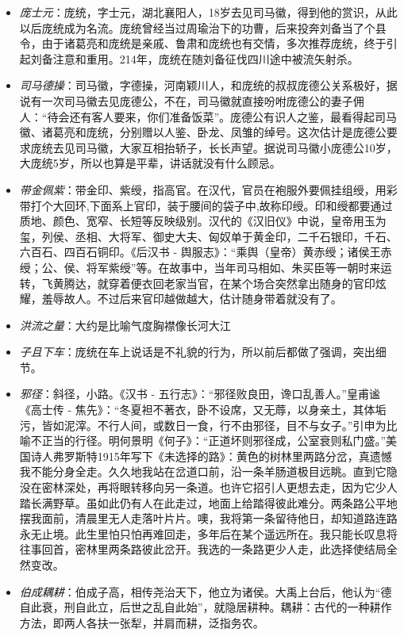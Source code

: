 \documentclass[]{book}
\providecommand{\tightlist}{%
  \setlength{\itemsep}{0pt}\setlength{\parskip}{0pt}}
\begin{document}
\begin{itemize}
\tightlist
\item
  \emph{庞士元}：庞统，字士元，湖北襄阳人，18岁去见司马徽，得到他的赏识，从此以后庞统成为名流。庞统曾经当过周瑜治下的功曹，后来投奔刘备当了个县令，由于诸葛亮和庞统是亲戚、鲁肃和庞统也有交情，多次推荐庞统，终于引起刘备注意和重用。214年，庞统在随刘备征伐四川途中被流矢射杀。
\item
  \emph{司马德操}：司马徽，字德操，河南颖川人，和庞统的叔叔庞德公关系极好，据说有一次司马徽去见庞德公，不在，司马徽就直接吩咐庞德公的妻子佣人：``待会还有客人要来，你们准备饭菜''。庞德公有识人之鉴，最看得起司马徽、诸葛亮和庞统，分别赠以人鉴、卧龙、凤雏的绰号。这次估计是庞德公要求庞统去见司马徽，大家互相抬轿子，长长声望。据说司马徽小庞德公10岁，大庞统5岁，所以也算是平辈，讲话就没有什么顾忌。
\item
  \emph{带金佩紫}：带金印、紫绶，指高官。在汉代，官员在袍服外要佩挂组绶，用彩带打个大回环,下面系上官印，装于腰间的袋子中,故称印绶。印和绶都要通过质地、颜色、宽窄、长短等反映级别。汉代的《汉旧仪》中说，皇帝用玉为玺，列侯、丞相、大将军、御史大夫、匈奴单于黄金印，二千石银印，千石、六百石、四百石铜印。《后汉书
  -
  舆服志》：``乘舆（皇帝）黄赤绶；诸侯王赤绶；公、侯、将军紫绶''等。在故事中，当年司马相如、朱买臣等一朝时来运转，飞黄腾达，就穿着便衣回老家当官，在某个场合突然拿出随身的官印炫耀，羞辱故人。不过后来官印越做越大，估计随身带着就没有了。
\item
  \emph{洪流之量}：大约是比喻气度胸襟像长河大江
\item
  \emph{子且下车}：庞统在车上说话是不礼貌的行为，所以前后都做了强调，突出细节。
\item
  \emph{邪径}：斜径，小路。《汉书 -
  五行志》：``邪径败良田，谗口乱善人。''皇甫谧《高士传 -
  焦先》：``冬夏袒不著衣，卧不设席，又无蓐，以身亲土，其体垢污，皆如泥滓。不行人间，或数日一食，行不由邪径，目不与女子。''引申为比喻不正当的行径。明何景明《何子》：``正道坏则邪径成，公室衰则私门盛。''美国诗人弗罗斯特1915年写下《未选择的路》：黄色的树林里两路分岔，真遗憾我不能分身全走。久久地我站在岔道口前，沿一条羊肠道极目远眺。直到它隐没在密林深处，再将眼转移向另一条道。也许它招引人更想去走，因为它少人踏长满野草。虽如此仍有人在此走过，地面上给踏得彼此难分。两条路公平地摆我面前，清晨里无人走落叶片片。噢，我将第一条留待他日，却知道路连路永无止境。此生里怕只怕再难回走，多年后在某个遥远所在。我只能长叹息将往事回首，密林里两条路彼此岔开。我选的一条路更少人走，此选择使结局全然变改。
\item
  \emph{伯成耦耕}：伯成子高，相传尧治天下，他立为诸侯。大禹上台后，他认为``德自此衰，刑自此立，后世之乱自此始''，就隐居耕种。耦耕：古代的一种耕作方法，即两人各扶一张犁，并肩而耕，泛指务农。

\end{itemize}
\end{document}
